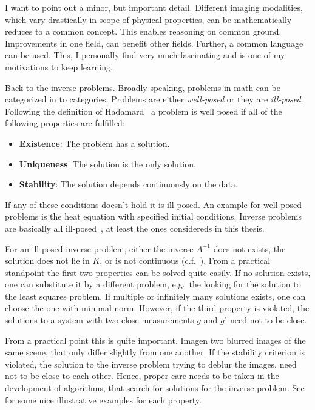 I want to point out a minor, but important detail. Different imaging modalities, which vary
drastically in scope of physical properties, can be mathematically reduces to a common concept. This
enables reasoning on common ground. Improvements in one field, can benefit other fields. Further, a
common language can be used. This, I personally find very much fascinating and is one of my
motivations to keep learning.

Back to the inverse problems. Broadly speaking, problems in math can be categorized in to
categories. Problems are either \textit{well-posed} or they are \textit{ill-posed}. Following the
definition of Hadamard~\cite{hadamard_sur_1902} a problem is well posed if all of the following
properties are fulfilled:

\begin{itemize}
	\item \textbf{Existence}: The problem has a solution.
	\item \textbf{Uniqueness}: The solution is the only solution.
	\item \textbf{Stability}: The solution depends continuously on the data.
\end{itemize}

If any of these conditions doesn't hold it is ill-posed. An example for well-posed problems is the
heat equation with specified initial conditions. Inverse problems are basically all
ill-posed~\cite{hansen_discrete_2010}, at least the ones considereds in this thesis.

For an ill-posed inverse problem, either the inverse \(A^{-1}\) does not exists, the solution does
not lie in \(K\), or is not continuous (c.f.~\cite[chap. 4]{natterer_mathematics_1986}). From a
practical standpoint the first two properties can be solved quite easily. If no solution exists, one
can substitute it by a different problem, e.g.\ the looking for the solution to the least squares
problem. If multiple or infinitely many solutions exists, one can choose the one with minimal norm.
However, if the third property is violated, the solutions to a system with two close measurements
\(g\) and \(g^\epsilon\) need not to be close.

From a practical point this is quite important. Imagen two blurred images of the same scene, that
only differ slightly from one another. If the stability criterion is violated, the solution to the
inverse problem trying to deblur the images, need not to be close to each other. Hence, proper care
needs to be taken in the development of algorithms, that search for solutions for the inverse
problem. See \citeauthor{hansen_discrete_2010}\cite{hansen_discrete_2010} for some nice illustrative
examples for each property.

